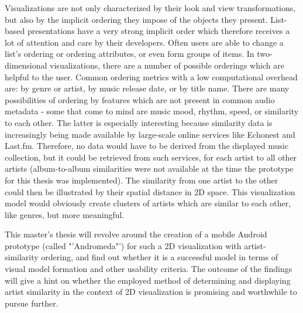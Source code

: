 Visualizations are not only characterized by their look and view transformations, but also by the implicit ordering they impose of the objects they present. List-based presentations have a very strong implicit order which therefore receives a lot of attention and care by their developers. Often users are able to change a list's ordering or ordering attributes, or even form groups of items. In two-dimensional visualizations, there are a number of possible orderings which are helpful to the user. Common ordering metrics with a low computational overhead are: by genre or artist, by music release date, or by title name. There are many possibilities of ordering by features which are not present in common audio metadata - some that come to mind are music mood, rhythm, speed, or similarity to each other. The latter is especially interesting because similarity data is increasingly being made available by large-scale online services like Echonest and Last.fm. Therefore, no data would have to be derived from the displayed music collection, but it could be retrieved from such services, for each artist to all other artists (album-to-album similarities were not available at the time the prototype for this thesis was implemented). The similarity from one artist to the other could then be illustrated by their spatial distance in 2D space. This visualization model would obviously create clusters of artists which are similar to each other, like genres, but more meaningful. 

This master's thesis will revolve around the creation of a mobile Android prototype (called "'Andromeda"') for such a 2D visualization with artist-similarity ordering, and find out whether it is a successful model in terms of visual model formation and other usability criteria. The outcome of the findings will give a hint on whether the employed method of determining and displaying artist similarity in the context of 2D visualization is promising and worthwhile to pursue further.